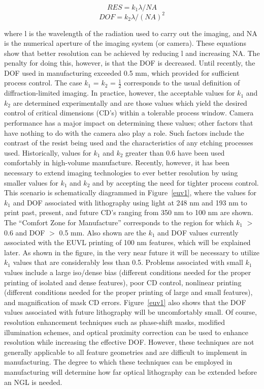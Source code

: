 \documentclass[12pt,a4paper]{report}
\begin{document}
$$RES = {k_1}{\lambda}/NA$$
$$DOF = {k_2}{\lambda}/(NA)^2 $$

where l is the wavelength of the radiation used to carry
out the imaging, and NA is the numerical aperture of the
imaging system (or camera). These equations show that
better resolution can be achieved by reducing l and
increasing NA. The penalty for doing this, however, is
that the DOF is decreased. Until recently, the DOF used
in manufacturing exceeded 0.5 mm, which provided for
sufficient process control.
The case $k_1$ = $k_2$ = $\frac{1}{2}$ corresponds to the usual definition
of diffraction-limited imaging. In practice, however, the
acceptable values for $k_1$ and $k_2$ are determined
experimentally and are those values which yield the
desired control of critical dimensions (CD’s) within a
tolerable process window. Camera performance has a
major impact on determining these values; other factors
that have nothing to do with the camera also play a role.
Such factors include the contrast of the resist being used
and the characteristics of any etching processes used.
Historically, values for $k_1$ and $k_2$ greater than 0.6 have
been used comfortably in high-volume manufacture.
Recently, however, it has been necessary to extend
imaging technologies to ever better resolution by using
smaller values for $k_1$ and $k_2$ and by accepting the need for
tighter process control. This scenario is schematically
diagrammed in Figure~\ref{euv1}, where the values for $k_1$ and
DOF associated with lithography using light at 248 nm
and 193 nm to print past, present, and future CD’s
ranging from 350 nm to 100 nm are shown. The
“Comfort Zone for Manufacture” corresponds to the
region for which $k_1$ $>$ 0.6 and DOF $>$ 0.5 mm. Also
shown are the $k_1$ and DOF values currently associated
with the EUVL printing of 100 nm features, which will
be explained later. As shown in the figure, in the very
near future it will be necessary to utilize $k_1$ values that
are considerably less than 0.5. Problems associated with
small $k_1$ values include a large iso/dense bias (different
conditions needed for the proper printing of isolated and
dense features), poor CD control, nonlinear printing
(different conditions needed for the proper printing of
large and small features), and magnification of mask CD
errors. Figure~\ref{euv1} also shows that the DOF values
associated with future lithography will be uncomfortably
small. Of course, resolution enhancement techniques
such as phase-shift masks, modified illumination
schemes, and optical proximity correction can be used to
enhance resolution while increasing the effective DOF.
However, these techniques are not generally applicable to
all feature geometries and are difficult to implement in
manufacturing. The degree to which these techniques
can be employed in manufacturing will determine how
far optical lithography can be extended before an NGL is
needed.
\end{document}
